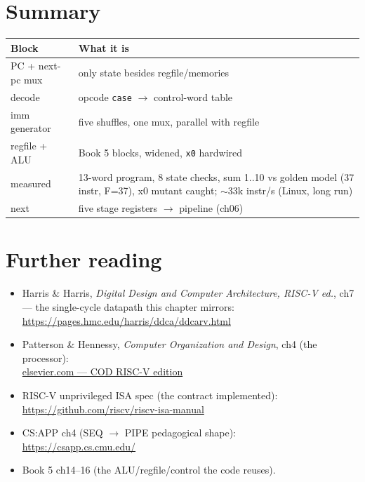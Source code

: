 \section{Summary}
\label{sec:summary05}
\begin{tabularx}{\linewidth}{@{}l X@{}}
\toprule
\textbf{Block} & \textbf{What it is} \\
\midrule
PC + next-pc mux & only state besides regfile/memories \\
decode & opcode \texttt{case} $\to$ control-word table \\
imm generator & five shuffles, one mux, parallel with regfile \\
regfile + ALU & Book 5 blocks, widened, \texttt{x0} hardwired \\
measured & 13-word program, 8 state checks, sum 1..10 vs golden model (37 instr, F=37), x0 mutant caught; $\sim$33k instr/s (Linux, long run) \\
next & five stage registers $\to$ pipeline (ch06) \\
\bottomrule
\end{tabularx}

\section*{Further reading}
\label{sec:further05}
\begin{itemize}
\item Harris \& Harris, \emph{Digital Design and Computer
      Architecture, RISC-V ed.}, ch7 --- the single-cycle
      datapath this chapter mirrors:\\
      \url{https://pages.hmc.edu/harris/ddca/ddcarv.html}
\item Patterson \& Hennessy, \emph{Computer Organization and Design},
      ch4 (the processor):\\
      \href{https://www.elsevier.com/books/computer-organization-and-design-risc-v-edition/patterson/978-0-12-820331-6}{elsevier.com --- COD RISC-V edition}
\item RISC-V unprivileged ISA spec (the contract implemented):\\
      \url{https://github.com/riscv/riscv-isa-manual}
\item CS:APP ch4 (SEQ $\to$ PIPE pedagogical shape):\\
      \url{https://csapp.cs.cmu.edu/}
\item Book 5 ch14--16 (the ALU/regfile/control the code reuses).
\end{itemize}

